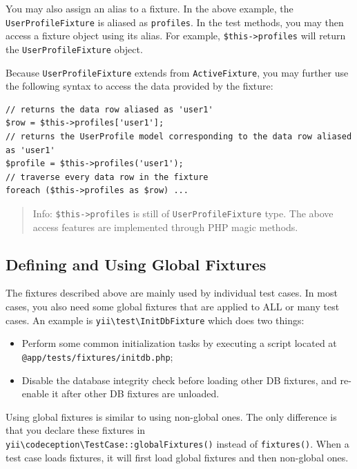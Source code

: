You may also assign an alias to a fixture. In the above example, the \lstinline|UserProfileFixture| is aliased as \lstinline|profiles|.
In the test methods, you may then access a fixture object using its alias. For example, \lstinline|$this->profiles| will
return the \lstinline|UserProfileFixture| object.

Because \lstinline|UserProfileFixture| extends from \lstinline|ActiveFixture|, you may further use the following syntax to access
the data provided by the fixture:

\lstset{language=php}\begin{lstlisting}
// returns the data row aliased as 'user1'
$row = $this->profiles['user1'];
// returns the UserProfile model corresponding to the data row aliased as 'user1'
$profile = $this->profiles('user1');
// traverse every data row in the fixture
foreach ($this->profiles as $row) ...
\end{lstlisting}
\begin{quote}Info: \lstinline|$this->profiles| is still of \lstinline|UserProfileFixture| type. The above access features are implemented
through PHP magic methods.

\end{quote}
\subsection{Defining and Using Global Fixtures}
The fixtures described above are mainly used by individual test cases. In most cases, you also need some global
fixtures that are applied to ALL or many test cases. An example is \texttt{yii{\allowbreak{}\textbackslash}test{\allowbreak{}\textbackslash}InitDbFixture} which does
two things:

\begin{itemize}
\item Perform some common initialization tasks by executing a script located at \lstinline|@app/tests/fixtures/initdb.php|;
\item Disable the database integrity check before loading other DB fixtures, and re-enable it after other DB fixtures are unloaded.
\end{itemize}
Using global fixtures is similar to using non-global ones. The only difference is that you declare these fixtures
in \texttt{yii{\allowbreak{}\textbackslash}codeception{\allowbreak{}\textbackslash}TestCase\allowbreak{}::\allowbreak{}globalFixtures()} instead of \lstinline|fixtures()|. When a test case loads fixtures, it will
first load global fixtures and then non-global ones.


